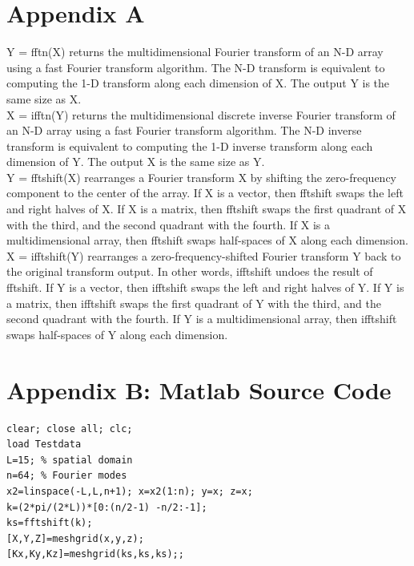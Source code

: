 \documentclass[12pt]{article}
\begin{document}
\section{Appendix A}
Y = fftn(X) returns the multidimensional Fourier transform of an N-D array using a fast Fourier transform algorithm. The N-D transform is equivalent to computing the 1-D transform along each dimension of X. The output Y is the same size as X.\\

X = ifftn(Y) returns the multidimensional discrete inverse Fourier transform of an N-D array using a fast Fourier transform algorithm. The N-D inverse transform is equivalent to computing the 1-D inverse transform along each dimension of Y. The output X is the same size as Y.\\

Y = fftshift(X) rearranges a Fourier transform X by shifting the zero-frequency component to the center of the array.
If X is a vector, then fftshift swaps the left and right halves of X.
If X is a matrix, then fftshift swaps the first quadrant of X with the third, and the second quadrant with the fourth.
If X is a multidimensional array, then fftshift swaps half-spaces of X along each dimension.\\

X = ifftshift(Y) rearranges a zero-frequency-shifted Fourier transform Y back to the original transform output. In other words, ifftshift undoes the result of fftshift.
If Y is a vector, then ifftshift swaps the left and right halves of Y.
If Y is a matrix, then ifftshift swaps the first quadrant of Y with the third, and the second quadrant with the fourth.
If Y is a multidimensional array, then ifftshift swaps half-spaces of Y along each dimension.\\
\section{Appendix B: Matlab Source Code}
\begin{lstlisting}[caption={Starter code}, frame=single]  
clear; close all; clc;
load Testdata
L=15; % spatial domain
n=64; % Fourier modes
x2=linspace(-L,L,n+1); x=x2(1:n); y=x; z=x;
k=(2*pi/(2*L))*[0:(n/2-1) -n/2:-1];
ks=fftshift(k);
[X,Y,Z]=meshgrid(x,y,z);
[Kx,Ky,Kz]=meshgrid(ks,ks,ks);;
\end{lstlisting}
\end{document}
